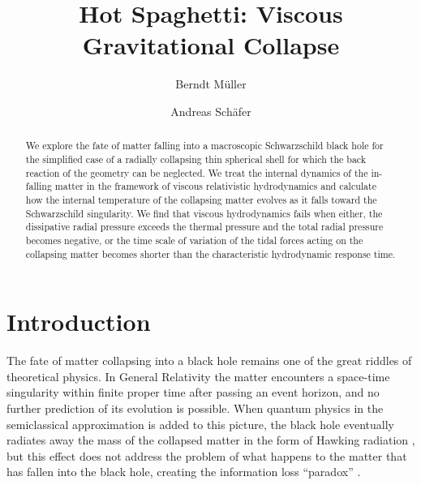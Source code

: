 \documentclass[article,twocolumn]{revtex4}
\begin{document}
\title{Hot Spaghetti: Viscous Gravitational Collapse}

\author{Berndt M\"uller}
\author{Andreas Sch\"afer}
%
\begin{abstract}
We explore the fate of matter falling into a macroscopic Schwarzschild black hole for the simplified case of a radially collapsing thin spherical shell for which the back reaction of the geometry can be neglected. We treat the internal dynamics of the in-falling matter in the framework of viscous relativistic hydrodynamics and calculate how the internal temperature of the collapsing matter evolves as it falls toward the Schwarzschild singularity. We find that viscous hydrodynamics fails when either, the dissipative radial pressure exceeds the thermal pressure and the total radial pressure becomes negative, or the time scale of variation of the tidal forces acting on the collapsing matter becomes shorter than the characteristic hydrodynamic response time.
\end{abstract}

\maketitle




\section{Introduction}

The fate of matter collapsing into a black hole \cite{Oppenheimer:1939ue} remains one of the great riddles of theoretical physics. In General Relativity the matter encounters a space-time singularity within finite proper time after passing an event horizon, and no further prediction of its evolution is possible. When quantum physics in the semiclassical approximation is added to this picture, the black hole eventually radiates away the mass of the collapsed matter in the form of Hawking radiation \cite{Hawking:1974sw}, but this effect does not address the problem of what happens to the matter that has fallen into the black hole, creating the information loss ``paradox'' \cite{tHooft:1995qox}.
\end{document}

